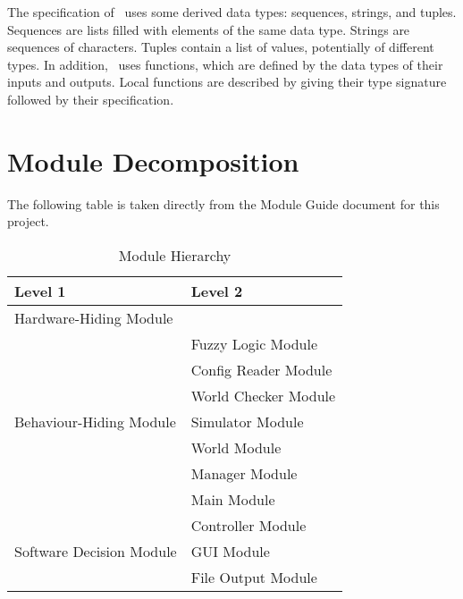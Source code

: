 \documentclass[12pt, titlepage]{article}
\begin{document}
\noindent
The specification of \progname \ uses some derived data types: sequences, strings, and
tuples. Sequences are lists filled with elements of the same data type. Strings
are sequences of characters. Tuples contain a list of values, potentially of
different types. In addition, \progname \ uses functions, which
are defined by the data types of their inputs and outputs. Local functions are
described by giving their type signature followed by their specification.

\section{Module Decomposition}

The following table is taken directly from the Module Guide document for this project.

\begin{table}[h!]
\centering
\begin{tabular}{p{} p{}}
\toprule
\textbf{Level 1} & \textbf{Level 2}\\
\midrule

{Hardware-Hiding Module} & ~ \\
\midrule

\multirow{7}{0.3\textwidth}{Behaviour-Hiding Module}
& Fuzzy Logic Module\\
& Config Reader Module\\
& World Checker Module\\
& Simulator Module\\
& World Module\\
& Manager Module\\
& Main Module\\
\midrule

\multirow{3}{0.3\textwidth}{Software Decision Module}
& Controller Module\\
& GUI Module\\
& File Output Module\\
\bottomrule

\end{tabular}
\caption{Module Hierarchy}
\label{TblMH}
\end{table}

\newpage
\end{document}
